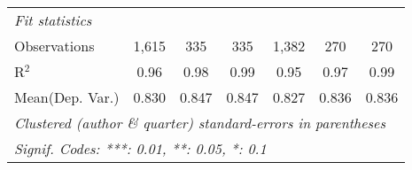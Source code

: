 \begin{tabular}{lcccccc}
   \midrule
   \emph{Fit statistics}\\
   Observations            & 1,615   & 335     & 335            & 1,382   & 270     & 270\\  
   R$^2$                   & 0.96    & 0.98    & 0.99           & 0.95    & 0.97    & 0.99\\  
Mean(Dep. Var.) & 0.830 & 0.847 & 0.847 & 0.827 & 0.836 & 0.836 \\
   \midrule \midrule
   \multicolumn{7}{l}{\emph{Clustered (author \& quarter) standard-errors in parentheses}}\\
   \multicolumn{7}{l}{\emph{Signif. Codes: ***: 0.01, **: 0.05, *: 0.1}}\\
\end{tabular}
\par\endgroup
